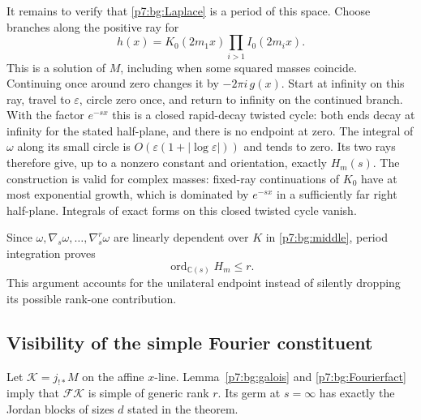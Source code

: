 \documentclass[11pt,a4paper]{article}
\theoremstyle{definition}
\theoremstyle{remark}
\numberwithin{equation}{section}
\begin{document}
It remains to verify that \eqref{p7:bg:Laplace} is a period of this
space.  Choose branches along the positive ray for
\[
 h(x)=K_0(2m_1x)\prod_{i>1}I_0(2m_ix).
\]
This is a solution of $M$, including when some squared masses
coincide.  Continuing once around zero changes it by
$-2\pi i\,g(x)$.  Start at infinity on this ray, travel to
$\varepsilon$, circle zero once, and return to infinity on the
continued branch.  With the factor $e^{-sx}$ this is a closed
rapid-decay twisted cycle: both ends decay at infinity for the
stated half-plane, and there is no endpoint at zero.  The integral
of $\omega$ along its small circle is
$O(\varepsilon(1+|\log\varepsilon|))$ and tends to zero.
Its two rays therefore give, up to a nonzero constant and orientation,
exactly $H_m(s)$.  The construction is valid for complex masses:
fixed-ray continuations of $K_0$ have at most exponential growth,
which is dominated by $e^{-sx}$ in a sufficiently far right half-plane.
Integrals of exact forms on this closed twisted cycle vanish.

Since $\omega,\nabla_s\omega,\ldots,\nabla_s^r\omega$ are
linearly dependent over $K$ in \eqref{p7:bg:middle}, period integration
proves
\begin{equation}\label{p7:bg:upper}
                         \operatorname{ord}_{\mathbb C(s)}H_m\le r.
\end{equation}
This argument accounts for the unilateral endpoint instead of
silently dropping its possible rank-one contribution.

\subsection{Visibility of the simple Fourier constituent}

Let $\mathcal K=j_{!*}M$ on the affine $x$-line.  Lemma~\ref{p7:bg:galois}
and \eqref{p7:bg:Fourierfact} imply that $\mathcal F\mathcal K$ is
simple of generic rank $r$.  Its germ at $s=\infty$ has exactly
the Jordan blocks of sizes $d$ stated in the theorem.
\end{document}
